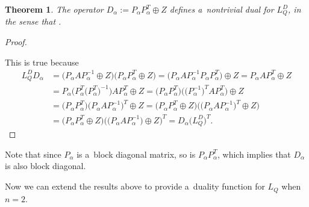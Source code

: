 \documentclass[10pt,a4paper]{amsart}
\numberwithin{equation}{section}
\newtheorem{Theorem}{Theorem}[section]
\theoremstyle{definition}
\def\mathcal#1{#1}
\def\mathsf#1{#1}
\begin{document}
\begin{Theorem}
\label{DiagonalStrategy}
The operator $\mathcal{D}_\alpha := \mathcal{P}_\alpha \mathcal{P}_{\alpha}^{\mathsf{T}} \oplus \mathcal{Z}$ defines a~nontrivial dual for $L_Q^D$, in the sense that \smash{$L_Q^D \mathcal{D}_\alpha = \mathcal{D}_\alpha \bigl(L_Q^D\bigr)^{\mathsf{T}}$}.
\end{Theorem}
\begin{proof} \label{DiagonalStrategyProof}

This is true because
 \begin{align*}
 L_Q^D \mathcal{D}_\alpha &= \bigl(\mathcal{P}_\alpha \mathcal{A} \mathcal{P}_\alpha^{-1} \oplus \mathcal{Z}\bigr)\bigl(\mathcal{P}_\alpha \mathcal{P}_\alpha^{\mathsf{T}} \oplus \mathcal{Z}\bigr)
 = \bigl(\mathcal{P}_\alpha \mathcal{A} \mathcal{P}_\alpha^{-1} \mathcal{P}_\alpha \mathcal{P}_\alpha^{\mathsf{T}}\bigr) \oplus \mathcal{Z}
 = \mathcal{P}_\alpha \mathcal{A} \mathcal{P}_\alpha^{\mathsf{T}} \oplus \mathcal{Z}\\
 &= \mathcal{P}_\alpha \bigl(\mathcal{P}_\alpha^{\mathsf{T}} \bigl(\mathcal{P}_\alpha^{\mathsf{T}}\bigr)^{-1}\bigr)\mathcal{A} \mathcal{P}_\alpha^{\mathsf{T}} \oplus \mathcal{Z} = \bigl(\mathcal{P}_\alpha \mathcal{P}_\alpha^{\mathsf{T}}\bigr)\bigl(\bigl(\mathcal{P}_\alpha^{-1}\bigr)^{T}\mathcal{A} \mathcal{P}_\alpha^{\mathsf{T}} \bigr) \oplus \mathcal{Z}
 \\
 & = \bigl(\mathcal{P}_\alpha \mathcal{P}_\alpha^{\mathsf{T}} \bigr)\bigl(\mathcal{P}_\alpha \mathcal{A} \mathcal{P}_\alpha^{-1} \bigr)^{\mathsf{T}} \oplus \mathcal{Z}
 = \bigl(\mathcal{P}_\alpha \mathcal{P}_\alpha^{\mathsf{T}} \oplus \mathcal{Z} \bigr)\bigl(\bigl(\mathcal{P}_\alpha \mathcal{A} \mathcal{P}_\alpha^{-1}\bigr)^{\mathsf{T}} \oplus \mathcal{Z}\bigr) \\
 &
 = \bigl(\mathcal{P}_\alpha \mathcal{P}_\alpha^{\mathsf{T}} \oplus \mathcal{Z}\bigr)\bigl(\bigl(\mathcal{P}_\alpha \mathcal{A} \mathcal{P}_\alpha^{-1}\bigr) \oplus \mathcal{Z}\bigr)^{\mathsf{T}}
 = \mathcal{D}_\alpha \bigl(L_Q^D\bigr)^{\mathsf{T}}.\tag*{\qed}
 \end{align*}\renewcommand{\qed}{}
\end{proof}


Note that since $\mathcal{P}_\alpha$ is a~block diagonal matrix, so is $\mathcal{P}_\alpha \mathcal{P}_\alpha^{\mathsf{T}}$, which implies that $\mathcal{D}_\alpha$ is also block diagonal.

Now we can extend the results above to provide a~duality function for $L_Q$ when $n=2$.
\end{document}
